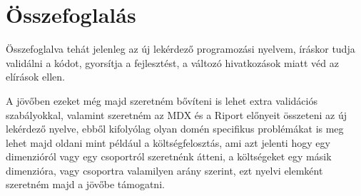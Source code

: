 \chapter{Összefoglalás}\label{sect:Summary}
Összefoglalva tehát jelenleg az új lekérdező programozási nyelvem, íráskor tudja
validálni a kódot, gyorsítja a fejlesztést, a változó hivatkozások miatt véd az
elírások ellen.

A jövőben ezeket még majd szeretném bővíteni is lehet extra validációs
szabályokkal, valamint szeretném az MDX és a Riport előnyeit összeteni az új
lekérdező nyelve, ebből kifolyólag olyan domén specifikus problémákat is meg
lehet majd oldani mint például a költségfelosztás, ami azt jelenti hogy egy
dimenzióról vagy egy csoportról szeretnénk átteni, a költségeket egy másik
dimenzióra, vagy csoportra valamilyen arány szerint, ezt nyelvi elemként
szeretném majd a jövőbe támogatni.

